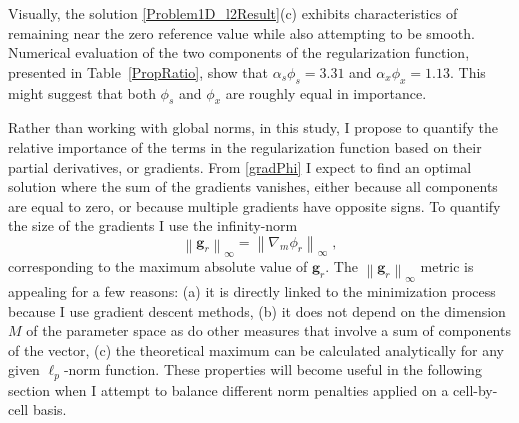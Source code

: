 Visually, the solution \ref{Problem1D_l2Result}(c) exhibits characteristics of remaining near the zero reference value while also attempting to be smooth. Numerical evaluation of the two components of the regularization function, presented in Table~\ref{PropRatio}, show that $\alpha_s\phi_s = 3.31$ and $\alpha_x\phi_x = 1.13$. This might suggest that both $\phi_s$ and $\phi_x$ are roughly equal in importance.

Rather than working with global norms, in this study, I propose to quantify the relative importance of the terms in the regularization function based on their partial derivatives, or gradients. From \eqref{gradPhi} I expect to find an optimal solution where the sum of the gradients vanishes, either because all components are equal to zero, or because multiple gradients have opposite signs. To quantify the size of the gradients I use the infinity-norm
\begin{equation}
\left\| \mathbf{g}_r \right\|_\infty = \left\| \nabla_m \phi_r\right\|_\infty \;,
\end{equation}
corresponding to the maximum absolute value of $\mathbf{g}_r$.
The $\left\|\mathbf{g}_r \right\|_\infty$ metric is appealing for a few reasons: (a) it is directly linked to the minimization process because I use gradient descent methods, (b) it does not depend on the dimension $M$ of the parameter space as do other measures that involve a sum of components of the vector, (c) the theoretical maximum can be calculated analytically for any given $\ell_p$-norm function. These properties will become useful in the following section when I attempt to balance different norm penalties applied on a cell-by-cell basis.

